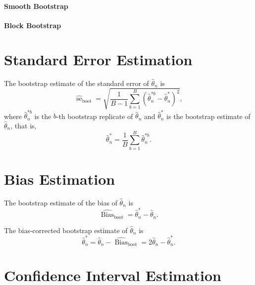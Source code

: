 \paragraph{Smooth Bootstrap}

\paragraph{Block Bootstrap}

\section{Standard Error Estimation}

The bootstrap estimate of the standard error of $\hat{\theta}_{n}$ is
\begin{equation}
	\widehat{\operatorname{se}}_{\text{boot}}=\sqrt{\frac{1}{B-1}\sum_{b=1}^{B}\left(\hat{\theta}_{n}^{*b}-\hat{\theta}_{n}^{*}\right)^{2}},
\end{equation}
where $\hat{\theta}_{n}^{*b}$ is the $b$-th bootstrap replicate of $\hat{\theta}_{n}$ and $\hat{\theta}_{n}^{*}$ is the bootstrap estimate of $\hat{\theta}_{n}$, that is,
\begin{equation}
	\hat{\theta}_{n}^{*}=\frac{1}{B}\sum_{b=1}^{B}\hat{\theta}_{n}^{*b}.
\end{equation}

\section{Bias Estimation}

The bootstrap estimate of the bias of $\hat{\theta}_{n}$ is
\begin{equation}
	\widehat{\operatorname{Bias}}_{\text{boot}}=\hat{\theta}_{n}^{*}-\hat{\theta}_{n}.
\end{equation}

\begin{remark}
	The bias-corrected bootstrap estimate of $\hat{\theta}_{n}$ is
	\begin{equation}
		\hat{\theta}_{n}^{*}=\hat{\theta}_{n}-\widehat{\operatorname{Bias}}_{\text{boot}}=2\hat{\theta}_{n}-\hat{\theta}_{n}^{*}.
	\end{equation}
\end{remark}

\section{Confidence Interval Estimation}

